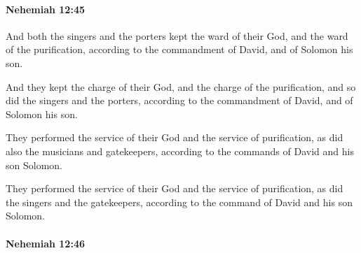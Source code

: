 		\paragraph{Nehemiah 12:45} %
			\label{NEHEMIAH-12-45}

			And both the singers and the porters kept the ward of their God, and the ward of the purification, according to the commandment of David, and of Solomon his son.

			\begin{versebox}
					\item[BHS] 
					\item[LXX] 
					\item[ASV] And they kept the charge of their God, and the charge of the purification, and so did the singers and the porters, according to the commandment of David, and of Solomon his son.
					\item[NIV] They performed the service of their God and the service of purification, as did also the musicians and gatekeepers, according to the commands of David and his son Solomon.
					\item[NRSV] They performed the service of their God and the service of purification, as did the singers and the gatekeepers, according to the command of David and his son Solomon.
			\end{versebox}

		\paragraph{Nehemiah 12:46} %
			\label{NEHEMIAH-12-46}

